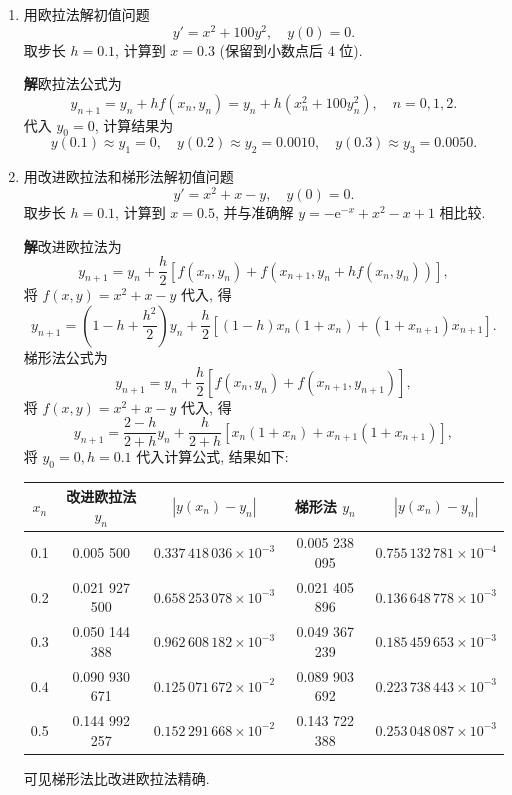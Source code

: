 \documentclass[a4paper,11pt]{ctexart}
\newcommand{\sol}{\par\noindent\textbf{解}\quad}
\newcommand{\e}{\mathrm{e}}
\begin{document}
\begin{enumerate}[label=\arabic*., leftmargin=*]
    \item 用欧拉法解初值问题
    \[
    y' = x^2 + 100y^2, \quad y(0) = 0.
    \]
    取步长 $h=0.1$, 计算到 $x=0.3$ (保留到小数点后 4 位).
    
    \sol 欧拉法公式为
    \[
    y_{n+1} = y_n + h f(x_n, y_n) = y_n + h(x_n^2 + 100y_n^2), \quad n=0, 1, 2.
    \]
    代入 $y_0 = 0$, 计算结果为
    \[
    y(0.1) \approx y_1 = 0, \quad y(0.2) \approx y_2 = 0.0010, \quad y(0.3) \approx y_3 = 0.0050.
    \]

    \item 用改进欧拉法和梯形法解初值问题
    \[
    y' = x^2 + x - y, \quad y(0) = 0.
    \]
    取步长 $h=0.1$, 计算到 $x=0.5$, 并与准确解 $y = -\e^{-x} + x^2 - x + 1$ 相比较.
    
    \sol 改进欧拉法为
    \[
    y_{n+1} = y_n + \frac{h}{2}[f(x_n, y_n) + f(x_{n+1}, y_n + hf(x_n, y_n))],
    \]
    将 $f(x, y) = x^2 + x - y$ 代入, 得
    \[
    y_{n+1} = \left( 1 - h + \frac{h^2}{2} \right)y_n + \frac{h}{2}[(1-h)x_n(1+x_n) + (1+x_{n+1})x_{n+1}].
    \]
    梯形法公式为
    \[
    y_{n+1} = y_n + \frac{h}{2}[f(x_n, y_n) + f(x_{n+1}, y_{n+1})],
    \]
    将 $f(x, y) = x^2 + x - y$ 代入, 得
    \[
    y_{n+1} = \frac{2-h}{2+h}y_n + \frac{h}{2+h}[x_n(1+x_n) + x_{n+1}(1+x_{n+1})],
    \]
    将 $y_0=0, h=0.1$ 代入计算公式, 结果如下:
    \begin{center}
    \begin{tabular}{c|c|c|c|c}
    \hline
    $x_n$ & 改进欧拉法 $y_n$ & $|y(x_n)-y_n|$ & 梯形法 $y_n$ & $|y(x_n)-y_n|$ \\
    \hline
    0.1 & 0.005 500 & $0.337\,418\,036 \times 10^{-3}$ & 0.005 238 095 & $0.755\,132\,781 \times 10^{-4}$ \\
    0.2 & 0.021 927 500 & $0.658\,253\,078 \times 10^{-3}$ & 0.021 405 896 & $0.136\,648\,778 \times 10^{-3}$ \\
    0.3 & 0.050 144 388 & $0.962\,608\,182 \times 10^{-3}$ & 0.049 367 239 & $0.185\,459\,653 \times 10^{-3}$ \\
    0.4 & 0.090 930 671 & $0.125\,071\,672 \times 10^{-2}$ & 0.089 903 692 & $0.223\,738\,443 \times 10^{-3}$ \\
    0.5 & 0.144 992 257 & $0.152\,291\,668 \times 10^{-2}$ & 0.143 722 388 & $0.253\,048\,087 \times 10^{-3}$ \\
    \hline
    \end{tabular}
    \end{center}
    可见梯形法比改进欧拉法精确.
\end{enumerate}
\end{document}
